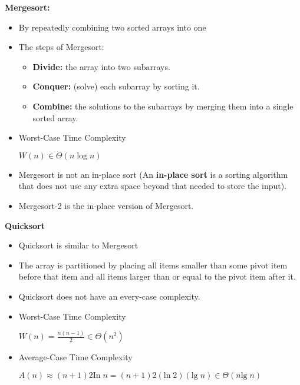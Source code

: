 \documentclass{../cheat}
\begin{document}
\begin{multicols}{3}
		\textbf{Mergesort:}
		\begin{itemize}
			\item By repeatedly combining two sorted arrays into one %
			\item The steps of Mergesort:
			\begin{itemize}[nolistsep, leftmargin=1em]
				\item \textbf{Divide:} the array into two subarrays.
				\item \textbf{Conquer:} (solve) each subarray by sorting it. 
				\item \textbf{Combine:} the solutions to the subarrays by merging them into a single sorted 
		array.
			\end{itemize}
			\item Worst-Case Time Complexity\\
				\centerline{ $W(n) \in \Theta(n \log n)$ }
			\item Mergesort is not an in-place sort (An \textbf{in-place sort} is a sorting algorithm that does not use any extra space beyond that needed to store the input).
			\item Mergesort-2 is the in-place version of Mergesort.
		\end{itemize}

	
	
		\textbf{Quicksort}
		\begin{itemize}
			\item Quicksort is similar to Mergesort
			\item The array is partitioned by placing all items smaller than some pivot item before that item and all items larger than or equal to the pivot item after it. 
			\item Quicksort does not have an every-case complexity.
			\item Worst-Case Time Complexity\\
				\centerline{ $W(n) = \frac{n(n-1)}{2} \in \Theta(n^2) $ }
			\item Average-Case Time Complexity \\
				\centerline{ $A(n) \approx (n + 1)2 \text{In}\; n = (n + 1)2(\text{ln}\; 2)(\text{lg}\; n) \in \Theta(n \text{lg}\; n)$}
		\end{itemize}


\end{multicols}
\end{document}
